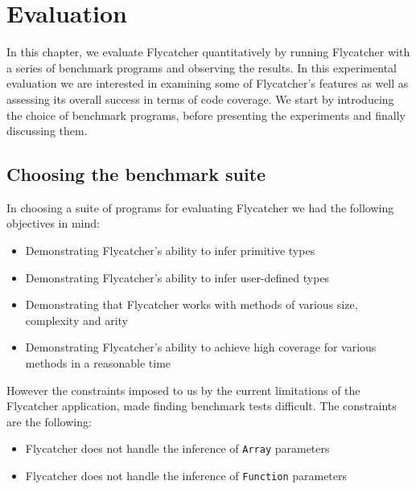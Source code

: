 \chapter{Evaluation}
In this chapter, we evaluate \textsf{Flycatcher} quantitatively by running \textsf{Flycatcher} with a series of benchmark programs and observing the results. In this experimental evaluation we are interested in examining some of \textsf{Flycatcher}'s features as well as assessing its overall success in terms of code coverage. We start by introducing the choice of benchmark programs, before presenting the experiments and finally discussing them.


\section{Choosing the benchmark suite}
In choosing a suite of programs for evaluating \textsf{Flycatcher} we had the following objectives in mind:

\begin{itemize}
   \item Demonstrating \textsf{Flycatcher}'s ability to infer primitive types
   \item Demonstrating \textsf{Flycatcher}'s ability to infer user-defined types
   \item Demonstrating that \textsf{Flycatcher} works with methods of various size, complexity and arity
   \item Demonstrating \textsf{Flycatcher}'s ability to achieve high coverage for various methods in a reasonable time
\end{itemize}

However the constraints imposed to us by the current limitations of the \textsf{Flycatcher} application, made finding benchmark tests difficult. The constraints are the following:

\begin{itemize}
   \item \textsf{Flycatcher} does not handle the inference of \texttt{Array} parameters
   \item \textsf{Flycatcher} does not handle the inference of \texttt{Function} parameters
\end{itemize}

